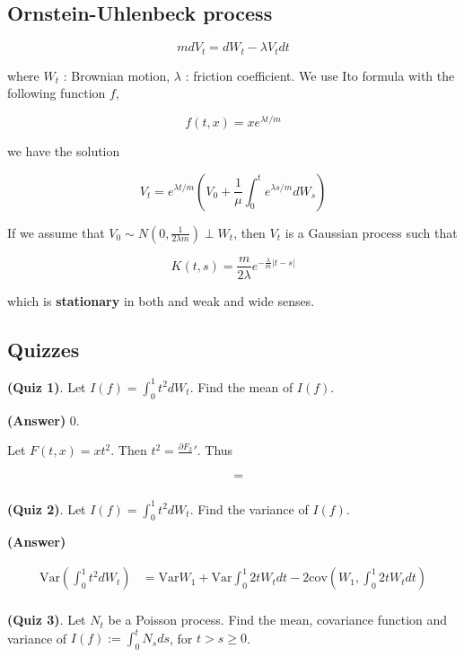 \documentclass[12pt]{article}
\theoremstyle{nonumberbreak}
\begin{document}
\subsection{Ornstein-Uhlenbeck process}

$$
m dV_t = dW_t - \lambda V_t dt
$$

where $W_t$ : Brownian motion, $\lambda$ : friction coefficient. We use Ito formula with the following function $f$,

$$
f(t,x) = x e^{\lambda t/m}
$$

we have the solution 

$$
V_t = e^{\lambda t/m} \left( V_0 + \frac{1}{\mu} \int_0^t e^{\lambda s/m} dW_s \right)
$$

If we assume that $V_0 \sim N \left( 0, \frac{1}{2\lambda m} \right) \perp W_t$, then $V_t$ is a Gaussian process such that

$$
K(t,s) = \frac{m}{2\lambda} e^{-\frac{\lambda}{m} |t-s| }
$$

which is \textbf{stationary} in both and weak and wide senses.



\subsection*{Quizzes}


\textbf{(Quiz 1)}. Let $I(f) = \int_0^1 t^2 dW_t$. Find the mean of $I(f)$. 

\textbf{(Answer)} $0$.

Let $F(t,x) = xt^2$. Then $t^2 = \frac{\partial F_2}{}'$. Thus 

$$
\begin{aligned}
 &= \\[8pt]
\end{aligned}
$$



\textbf{(Quiz 2)}. Let $I(f) = \int_0^1 t^2 dW_t$. Find the variance of $I(f)$. 

\textbf{(Answer)} 

$$
\begin{aligned}
\mathrm{Var} \left( \int_0^1 t^2 dW_t \right) &= \mathrm{Var} W_1 + \mathrm{Var} \int_0^1 2t W_t dt - 2\mathrm{cov} \left( W_1, \int_0^1 2t W_t dt \right) \\[8pt]
\end{aligned}
$$


\textbf{(Quiz 3)}. Let $N_t$ be a Poisson process. Find the mean, covariance function and variance of $I(f) := \int_0^t N_s ds$, for $t > s \ge 0$. 
\end{document}
